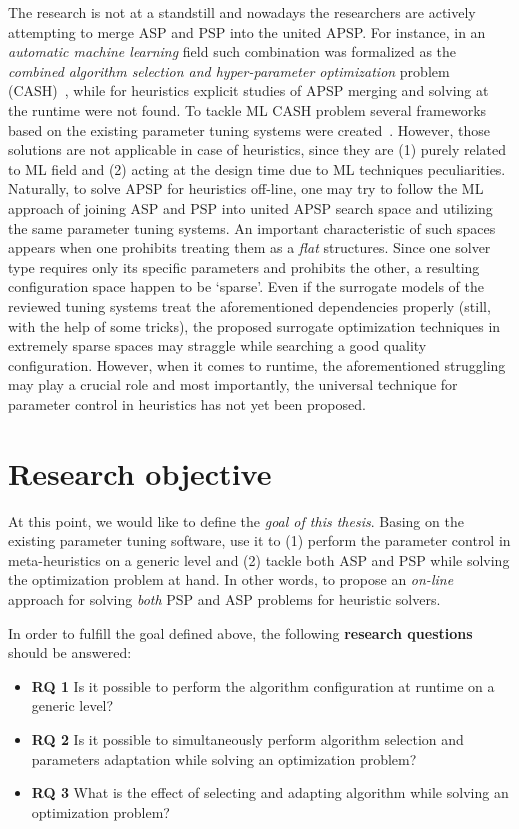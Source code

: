The research is not at a standstill and nowadays the researchers are actively attempting to merge ASP and PSP into the united APSP. For instance, in an \emph{automatic machine learning} field such combination was formalized as the \emph{combined algorithm selection and hyper-parameter optimization} problem (CASH)~\cite{thornton2013auto}, while for heuristics explicit studies of APSP merging and solving at the runtime were not found. To tackle ML CASH problem several frameworks based on the existing parameter tuning systems were created~\cite{thornton2013auto,feurer2015efficient,olson2019tpot}. However, those solutions are not applicable in case of heuristics, since they are (1) purely related to ML field and (2) acting at the design time due to ML techniques peculiarities. Naturally, to solve APSP for heuristics off-line, one may try to follow the ML approach of joining ASP and PSP into united APSP search space and utilizing the same parameter tuning systems. An important characteristic of such spaces appears when one prohibits treating them as a \emph{flat} structures. Since one solver type requires only its specific parameters and prohibits the other, a resulting configuration space happen to be `sparse'. Even if the surrogate models of the reviewed tuning systems treat the aforementioned dependencies properly (still, with the help of some tricks), the proposed surrogate optimization techniques in extremely sparse spaces may straggle while searching a good quality configuration. However, when it comes to runtime, the aforementioned struggling may play a crucial role and most importantly, the universal technique for parameter control in heuristics has not yet been proposed.

\section{Research objective}\label{intro: research objective}
At this point, we would like to define the \emph{goal of this thesis}. Basing on the existing parameter tuning software, use it to (1) perform the parameter control in meta-heuristics on a generic level and (2) tackle both ASP and PSP while solving the optimization problem at hand. In other words, to propose an \emph{on-line} approach for solving \emph{both} PSP and ASP problems for heuristic solvers.

In order to fulfill the goal defined above, the following \textbf{research questions} should be answered:
\begin{itemize}
	\item \textbf{RQ 1} Is it possible to perform the algorithm configuration at runtime on a generic level?
	
	\item \textbf{RQ 2} Is it possible to simultaneously perform algorithm selection and parameters adaptation while solving an optimization problem?
	
	\item \textbf{RQ 3} What is the effect of selecting and adapting algorithm while solving an optimization problem?
\end{itemize}



